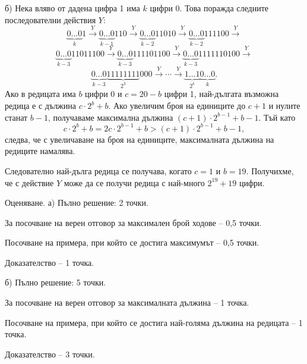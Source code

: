 б) Нека вляво от дадена цифра 1 има $k$ цифри 0. Това поражда следните последователни действия $Y$:
$$
\underbrace{0\ldots0}_{k}1\xrightarrow{Y}\underbrace{0\ldots0}_{k-1}110\xrightarrow{Y}\underbrace{0\ldots0}_{k-2}11010\xrightarrow{Y}\underbrace{0\ldots0}_{k-2}111100\xrightarrow{Y}
$$
$$
\underbrace{0\ldots0}_{k-3}11011100\xrightarrow{Y}\underbrace{0\ldots0}_{k-3}111101100\xrightarrow{Y}\underbrace{0\ldots0}_{k-3}1111110100\xrightarrow{Y}
$$
$$
\underbrace{0\ldots0}_{k-3}\underbrace{11111111}_{2^3}000\xrightarrow{Y}\cdots\xrightarrow{Y}\underbrace{1\ldots1}_{2^k}\underbrace{0\ldots0}_{k}.
$$
Ако в редицата има $b$ цифри 0 и $c=20-b$ цифри 1, най-дългата възможна редица е с дължина $c\cdot2^b+b$. Ако увеличим броя на единиците до $c+1$ и нулите станат $b-1$, получаваме максимална дължина $(c+1)\cdot2^{b-1}+b-1$. Тъй като
$$
c\cdot2^b+b=2c\cdot2^{b-1}+b>(c+1)\cdot2^{b-1}+b-1,
$$
следва, че с увеличаване на броя на единиците, максималната дължина на редиците намалява.

Следователно най-дълга редица се получава, когато $c=1$ и $b=19$. Получихме, че с действие $Y$ може да се получи редица с най-много $2^{19}+19$ цифри.

Оценяване. а) Пълно решение: 2 точки.

За посочване на верен отговор за максимален брой ходове – 0,5 точки.

Посочване на примера, при който се достига максимумът – 0,5 точки.

Доказателство – 1 точка.

б) Пълно решение: 5 точки.

За посочване на верен отговор за максималната дължина – 1 точка.

Посочване на примера, при който се достига най-голяма дължина на редицата – 1 точка.

Доказателство – 3 точки.
